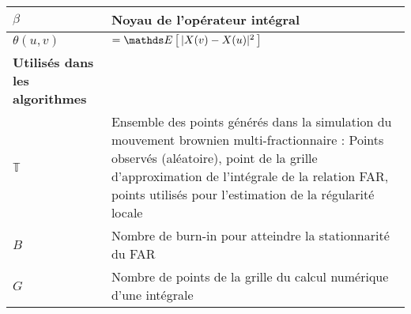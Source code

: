 \begin{table}[H]
\begin{tabularx}{\textwidth}{lX}
		$\beta$                                                                                         & Noyau de l'opérateur intégral                                                                                                                                                                                                                                                                                                               \\
		\midrule
		$\theta(u,v)$                                                                                   & $= \esperance{ |X(v) - X(u)|^2 }$                                                                                                                                                                                                                                                                                                           \\
		\toprule
		\textbf{Utilisés dans les algorithmes}                                                   		&                                                                                                                                                                                                                                                                                                                                             \\
		\midrule
		$\mathds T$                                                                                     & Ensemble des points générés dans la simulation du mouvement brownien multi-fractionnaire : Points observés (aléatoire), point de la grille d'approximation de l'intégrale de la relation FAR, points utilisés pour l'estimation de la régularité locale                                                                                     \\
		$B$                                                                                             & Nombre de burn-in pour atteindre la stationnarité du FAR                                                                                                                                                                                                                                                                                    \\
		$G$                                                                                             & Nombre de points de la grille du calcul numérique d'une intégrale                                                                                                                                                                                                                                                                           \\

\end{tabularx}
\end{table}
